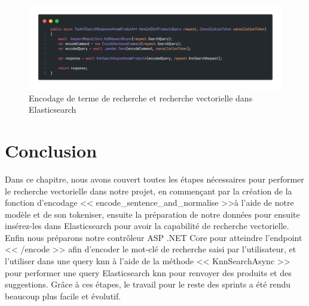 \begin{figure}[H]
	\centering
	\includegraphics[width=1\textwidth]{logos/returnencodedvector.png}
	\caption{Encodage de terme de recherche et recherche vectorielle dans Elasticsearch}
	\label{fig:returnencodedvector}
\end{figure}


\newpage
\section{Conclusion}
\noindent
Dans ce chapitre, nous avons couvert toutes les étapes nécessaires pour performer le recherche vectorielle dans notre projet, en commençant par la création de la fonction d'encodage << encode\_sentence\_and\_normalise >>à l'aide de notre modèle et de son tokeniser, ensuite la préparation de notre données pour ensuite insérez-les dans Elasticsearch pour avoir la capabilité de recherche vectorielle. Enfin nous préparons notre contrôleur ASP .NET Core pour atteindre l'endpoint << /encode >> afin d'encoder le mot-clé de recherche saisi par l'utilisateur, et l'utiliser dans une query knn à l'aide de la méthode << KnnSearchAsync >> pour performer une query Elasticsearch knn pour renvoyer des produits et des suggestions.
Grâce à ces étapes, le travail pour le reste des sprints a été rendu beaucoup plus facile et évolutif.